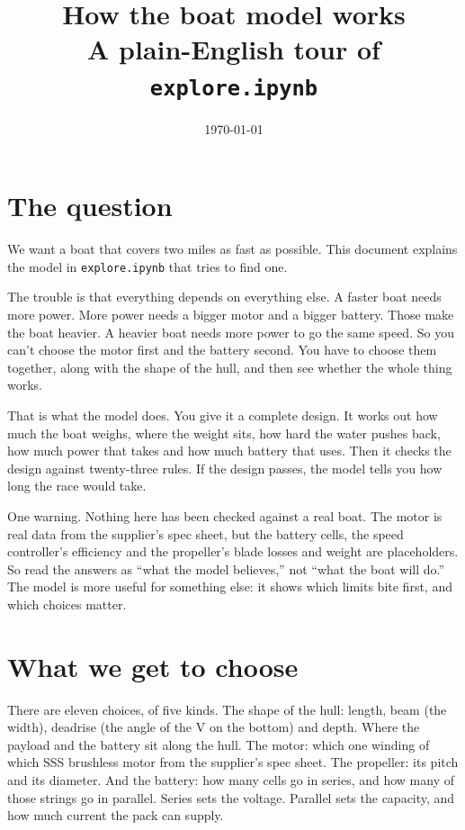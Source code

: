 \documentclass[11pt,a4paper]{article}
\title{How the boat model works\\[0.4em]
\large A plain-English tour of \texttt{explore.ipynb}}
\author{}
\date{\today}
\renewcommand{\_}{\textunderscore\allowbreak}
\newcommand{\code}[1]{\texttt{#1}}
\begin{document}
\maketitle
\thispagestyle{fancy}

\section*{The question}

We want a boat that covers two miles as fast as possible. This document explains the model in \code{explore.ipynb} that tries to find one.

The trouble is that everything depends on everything else. A faster boat needs more power. More power needs a bigger motor and a bigger battery.
Those make the boat heavier. A heavier boat needs more power to go the same speed. So you can't choose the motor first and the battery second.
You have to choose them together, along with the shape of the hull, and then see whether the whole thing works.

That is what the model does. You give it a complete design. It works out how much the boat weighs, where the weight sits, how hard the water pushes back,
how much power that takes and how much battery that uses. Then it checks the design against twenty-three rules. If the design passes, the model tells you how long the race would take.

One warning. Nothing here has been checked against a real boat. The motor is real data from the supplier's spec sheet, but the battery cells, the speed controller's efficiency and the propeller's blade losses and weight are placeholders.
So read the answers as ``what the model believes,'' not ``what the boat will do.'' The model is more useful for something else: it shows which limits bite first,
and which choices matter.

\section*{What we get to choose}

There are eleven choices, of five kinds. The shape of the hull: length, beam (the width), deadrise (the angle of the V on the bottom) and depth.
Where the payload and the battery sit along the hull. The motor: which one winding of which SSS brushless motor from the supplier's spec sheet. The propeller: its pitch and its diameter. And the battery: how many cells go in series, and how many of
those strings go in parallel. Series sets the voltage. Parallel sets the capacity, and how much current the pack can supply.
\end{document}
